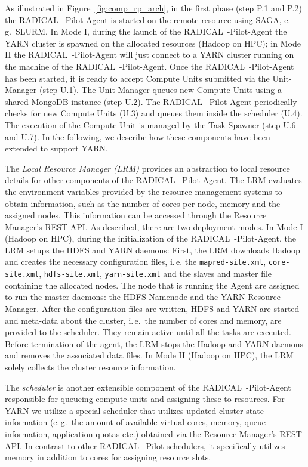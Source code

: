 As illustrated in Figure~\ref{fig:comp_rp_arch}, in the first phase (step P.1 and P.2) the RADICAL~-Pilot-Agent is started on the remote resource using SAGA, e.\,g.\ SLURM.
In Mode I, during the launch of the RADICAL~-Pilot-Agent the YARN cluster is spawned on the allocated resources (Hadoop on HPC); in Mode II the RADICAL~-Pilot-Agent will just connect to a YARN cluster running on the machine of the RADICAL~-Pilot-Agent.
Once the RADICAL~-Pilot-Agent has been started, it is ready to accept Compute Units submitted via the Unit-Manager (step U.1).
The Unit-Manager queues new Compute Units using a shared MongoDB instance (step U.2).
The RADICAL~-Pilot-Agent periodically checks for new Compute Units (U.3) and queues them inside the scheduler (U.4).
The execution of the Compute Unit is managed by the Task Spawner (step U.6 and U.7).
In the following, we describe how these components have been extended to support YARN.


The \emph{Local Resource Manager (LRM)} provides an abstraction to local resource details for other components of the RADICAL~-Pilot-Agent.
The LRM evaluates the environment variables provided by the resource management systems to obtain information, such as the number of cores per node, memory and the assigned nodes.
This information can be accessed through the Resource Manager's REST API.
As described, there are two deployment modes.
In Mode I (Hadoop on HPC), during the initialization of the RADICAL~-Pilot-Agent, the LRM setups the HDFS and YARN daemons: 
First, the LRM downloads Hadoop and creates the necessary configuration files, i.\,e. the \texttt{mapred-site.xml}, \texttt{core-site.xml}, \texttt{hdfs-site.xml}, \texttt{yarn-site.xml} and the slaves and master file containing the allocated nodes.
The node that is running the Agent are assigned to run the master daemons: the HDFS Namenode and the YARN Resource Manager.
After the configuration files are written, HDFS and YARN are started and meta-data about the cluster, i.\,e.\ the number of cores and memory, are provided to the scheduler.
They remain active until all the tasks are executed.
Before termination of the agent, the LRM stops the Hadoop and YARN daemons and removes the associated data files.
In Mode II (Hadoop on HPC), the LRM solely collects the cluster resource information.

The \emph{scheduler} is another extensible component of the RADICAL~-Pilot-Agent responsible for queueing compute units and assigning these to resources.
For YARN we utilize a special scheduler that utilizes updated cluster state information (e.\,g.\ the amount of available virtual cores, memory, queue information, application quotas etc.) obtained via the Resource Manager's REST API.
In contrast to other RADICAL~-Pilot schedulers, it specifically utilizes memory in addition to cores for assigning resource slots.

